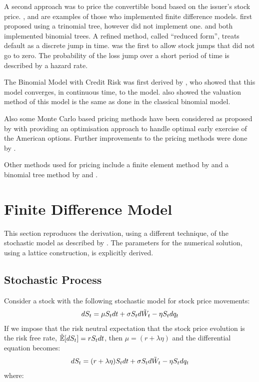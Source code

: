 \documentclass[a4paper,11pt,oneside]{report}
\theoremstyle{plain}
\theoremstyle{definition}
\begin{document}
A second approach was to price the convertible bond based on the issuer's stock price.  , \citet{TF98} and  \citet{MS86} are examples of those who implemented finite difference models.   first proposed using a trinomial tree, however did not implement one.   and \citet{H11} both implemented binomial trees.  A refined method, called ``reduced form'', treats default as a discrete jump in time.   was the first to allow stock jumps that did not go to zero.  The probability of the loss jump over a short period of time is described by a hazard rate.

The Binomial Model with Credit Risk was first derived by \citet{MK12}, who showed that this model converges, in continuous time, to the \citet{AFV03} model.   also showed the valuation method of this model is the same as done in the classical binomial model.

Also some Monte Carlo based pricing methods have been considered as proposed by \citet{B89} with \citet{G03} providing an optimisation approach to handle optimal early exercise of the American options.  Further improvements to the pricing methods were done by \citet{AKW08}.

Other methods used for pricing include a finite element method by \citet{BBH03} and a binomial tree method by \citet{TKN01} and \citet{AFV02}.


\chapter{Finite Difference Model}
This section reproduces the derivation, using a different technique, of the stochastic model as described by \citet{AFV03}.  The parameters for the numerical solution, using a lattice construction, is explicitly derived.


\section{Stochastic Process}
Consider a stock with the following stochastic model for stock price movements:
\begin{equation}
 dS_t = \mu S_tdt + \sigma S_td\tilde{W}_t - \eta S_tdq_t
\end{equation}
If we impose that the risk neutral expectation that the stock price evolution is the risk free rate, $\E[\dS] = r\S\dt$, then $\mu = (r + \lambda\eta)$ and the differential equation becomes:
\begin{equation}
 dS_t = (r + \lambda\eta)S_tdt + \sigma S_td\tilde{W}_t - \eta S_tdq_t
\end{equation}
where:
\end{document}
